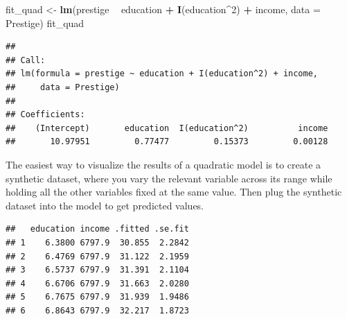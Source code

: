 \documentclass[12pt,oneside,openany]{book}
\newenvironment{Shaded}{\begin{snugshade}}{\end{snugshade}}
\newcommand{\KeywordTok}[1]{\textcolor[rgb]{0.13,0.29,0.53}{\textbf{#1}}}
\newcommand{\DataTypeTok}[1]{\textcolor[rgb]{0.13,0.29,0.53}{#1}}
\newcommand{\DecValTok}[1]{\textcolor[rgb]{0.00,0.00,0.81}{#1}}
\newcommand{\StringTok}[1]{\textcolor[rgb]{0.31,0.60,0.02}{#1}}
\newcommand{\OperatorTok}[1]{\textcolor[rgb]{0.81,0.36,0.00}{\textbf{#1}}}
\newcommand{\NormalTok}[1]{#1}
\begin{document}
\begin{Shaded}
\begin{Highlighting}[]
\NormalTok{fit_quad <-}\StringTok{ }\KeywordTok{lm}\NormalTok{(prestige }\OperatorTok{~}\StringTok{ }\NormalTok{education }\OperatorTok{+}\StringTok{ }\KeywordTok{I}\NormalTok{(education}\OperatorTok{^}\DecValTok{2}\NormalTok{) }\OperatorTok{+}\StringTok{ }\NormalTok{income, }\DataTypeTok{data =}\NormalTok{ Prestige)}
\NormalTok{fit_quad}
\end{Highlighting}
\end{Shaded}

\begin{verbatim}
## 
## Call:
## lm(formula = prestige ~ education + I(education^2) + income, 
##     data = Prestige)
## 
## Coefficients:
##    (Intercept)       education  I(education^2)          income  
##       10.97951         0.77477         0.15373         0.00128
\end{verbatim}

The easiest way to visualize the results of a quadratic model is to
create a synthetic dataset, where you vary the relevant variable across
its range while holding all the other variables fixed at the same value.
Then plug the synthetic dataset into the model to get predicted values.

\begin{Shaded}
\end{Shaded}

\begin{verbatim}
##   education income .fitted .se.fit
## 1    6.3800 6797.9  30.855  2.2842
## 2    6.4769 6797.9  31.122  2.1959
## 3    6.5737 6797.9  31.391  2.1104
## 4    6.6706 6797.9  31.663  2.0280
## 5    6.7675 6797.9  31.939  1.9486
## 6    6.8643 6797.9  32.217  1.8723
\end{verbatim}
\end{document}

